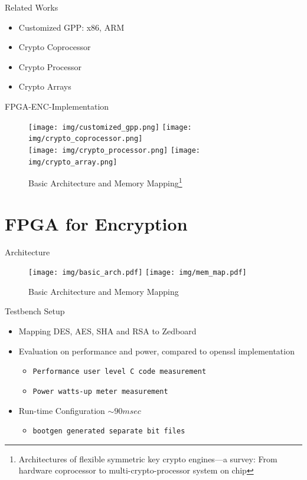 \documentclass[t]{beamer}
\begin{document}
\begin{frame}{Related Works}
	\begin{itemize}
		\item Customized GPP: x86, ARM
		\item Crypto Coprocessor
		\item Crypto Processor 
		\item Crypto Arrays
	\end{itemize}
\end{frame}

\begin{frame}{FPGA-ENC-Implementation}
	\begin{figure}
        \texttt{[image: img/customized\_gpp.png]}
        \texttt{[image: img/crypto\_coprocessor.png]}\\
        \texttt{[image: img/crypto\_processor.png]}
        \texttt{[image: img/crypto\_array.png]}
		\caption{Basic Architecture and Memory Mapping\footnote{Architectures of flexible symmetric key crypto engines—a survey: From hardware coprocessor to multi-crypto-processor system on chip}}
		\label{fig:types_of_fpga_enc}
	\end{figure}
\end{frame}

\section{FPGA for Encryption}
\begin{frame}{Architecture}
	\begin{figure}
        \texttt{[image: img/basic\_arch.pdf]}
        \texttt{[image: img/mem\_map.pdf]}
		\caption{Basic Architecture and Memory Mapping}
		\label{fig:Iot_trend}
	\end{figure}
\end{frame}

\begin{frame}{Testbench Setup}
	\begin{itemize}
		\item Mapping DES, AES, SHA and RSA to Zedboard
		\item Evaluation on performance and power, compared to openssl implementation
		\begin{itemize}
			\item \tt Performance user level C code measurement
			\item \tt Power watts-up meter measurement
		\end{itemize}
		\item Run-time Configuration $\sim 90 msec$ 
		\begin{itemize}
			\item \tt bootgen generated separate bit files
		\end{itemize}
	\end{itemize}
\end{frame}
\end{document}
